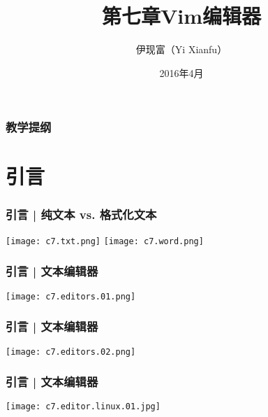 



\title[Vim]{第七章\quad Vim编辑器}
\author[Yixf]{伊现富（Yi Xianfu）}
\date{2016年4月}


\begin{frame}
  \titlepage
\end{frame}

\begin{frame}[plain,label=current]
  \frametitle{教学提纲}
  \setcounter{tocdepth}{3}
  \begin{multicols}{2}
    \tableofcontents
  \end{multicols}
\end{frame}


\section{引言}
\begin{frame}
  \frametitle{引言 | 纯文本 vs. 格式化文本}
  \begin{center}
    \texttt{[image: c7.txt.png]}
    \vspace*{0.1cm}
    \texttt{[image: c7.word.png]}
  \end{center}
\end{frame}

\begin{frame}
  \frametitle{引言 | 文本编辑器}
  \begin{center}
    \texttt{[image: c7.editors.01.png]}
  \end{center}
\end{frame}

\begin{frame}
  \frametitle{引言 | 文本编辑器}
  \begin{center}
    \texttt{[image: c7.editors.02.png]}
  \end{center}
\end{frame}

\begin{frame}
  \frametitle{引言 | 文本编辑器}
  \begin{center}
    \texttt{[image: c7.editor.linux.01.jpg]}
  \end{center}
\end{frame}

